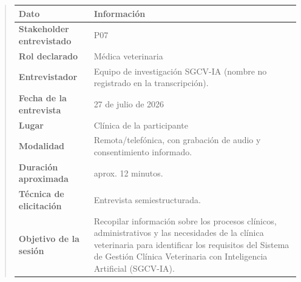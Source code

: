 \documentclass[
]{article}
\newcounter{none} %
\begin{document}
\begin{quote}
{\def\LTcaptype{none} %
\begin{longtable}[]{|
  >{\raggedright\arraybackslash}p{}|
  >{\raggedright\arraybackslash}p{}|}
\hline
\begin{minipage}[b]{\linewidth}\centering
\textbf{Dato}
\end{minipage} & \begin{minipage}[b]{\linewidth}\centering
\textbf{Información}
\end{minipage} \\
\hline
\endhead
\hline
\endlastfoot
\textbf{Stakeholder entrevistado} & \begin{minipage}[t]{\linewidth}\raggedright
P07
\end{minipage} \\
\hline
\textbf{Rol declarado} & \begin{minipage}[t]{\linewidth}\raggedright
Médica veterinaria
\end{minipage} \\
\hline
\textbf{Entrevistador} & \begin{minipage}[t]{\linewidth}\raggedright
Equipo de investigación SGCV-IA (nombre no registrado en la transcripción).
\end{minipage} \\
\hline
\textbf{Fecha de la entrevista} & \begin{minipage}[t]{\linewidth}\raggedright
27 de julio de 2026
\end{minipage} \\
\hline
\textbf{Lugar} & \begin{minipage}[t]{\linewidth}\raggedright
Clínica de la participante
\end{minipage} \\
\hline
\textbf{Modalidad} & \begin{minipage}[t]{\linewidth}\raggedright
Remota/telefónica, con grabación de audio y consentimiento informado.
\end{minipage} \\
\hline
\textbf{Duración aproximada} & \begin{minipage}[t]{\linewidth}\raggedright
aprox. 12 minutos.
\end{minipage} \\
\hline
\textbf{Técnica de elicitación} & \begin{minipage}[t]{\linewidth}\raggedright
Entrevista semiestructurada.
\end{minipage} \\
\hline
\textbf{Objetivo de la sesión} & \begin{minipage}[t]{\linewidth}\raggedright
Recopilar información sobre los procesos clínicos, administrativos y las necesidades de la clínica veterinaria para identificar los requisitos del Sistema de Gestión Clínica Veterinaria con Inteligencia Artificial (SGCV-IA).
\end{minipage} \\
\hline
\end{longtable}
}


\end{quote}
\end{document}
